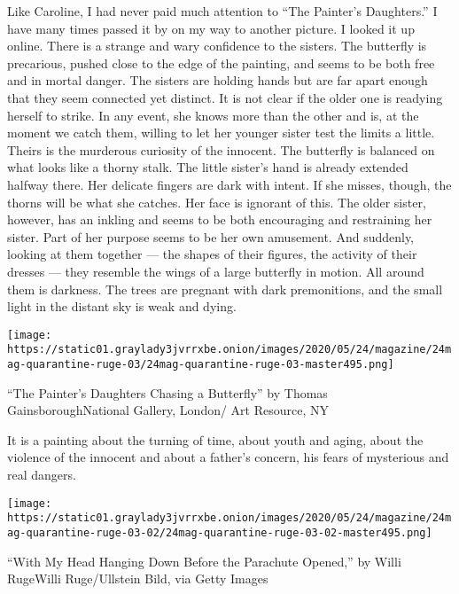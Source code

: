 Like Caroline, I had never paid much attention to ``The Painter's
Daughters.'' I have many times passed it by on my way to another
picture. I looked it up online. There is a strange and wary confidence
to the sisters. The butterfly is precarious, pushed close to the edge of
the painting, and seems to be both free and in mortal danger. The
sisters are holding hands but are far apart enough that they seem
connected yet distinct. It is not clear if the older one is readying
herself to strike. In any event, she knows more than the other and is,
at the moment we catch them, willing to let her younger sister test the
limits a little. Theirs is the murderous curiosity of the innocent. The
butterfly is balanced on what looks like a thorny stalk. The little
sister's hand is already extended halfway there. Her delicate fingers
are dark with intent. If she misses, though, the thorns will be what she
catches. Her face is ignorant of this. The older sister, however, has an
inkling and seems to be both encouraging and restraining her sister.
Part of her purpose seems to be her own amusement. And suddenly, looking
at them together --- the shapes of their figures, the activity of their
dresses --- they resemble the wings of a large butterfly in motion. All
around them is darkness. The trees are pregnant with dark premonitions,
and the small light in the distant sky is weak and dying.

\texttt{[image: https://static01.graylady3jvrrxbe.onion/images/2020/05/24/magazine/24mag-quarantine-ruge-03/24mag-quarantine-ruge-03-master495.png]}

``The Painter's Daughters Chasing a Butterfly'' by Thomas
GainsboroughNational Gallery, London/ Art Resource, NY

It is a painting about the turning of time, about youth and aging, about
the violence of the innocent and about a father's concern, his fears of
mysterious and real dangers.

\texttt{[image: https://static01.graylady3jvrrxbe.onion/images/2020/05/24/magazine/24mag-quarantine-ruge-03-02/24mag-quarantine-ruge-03-02-master495.png]}

``With My Head Hanging Down Before the Parachute Opened,'' by Willi
RugeWilli Ruge/Ullstein Bild, via Getty Images

